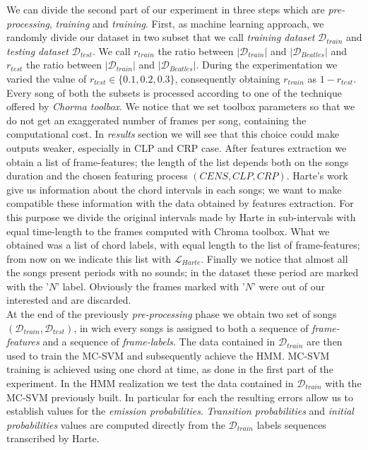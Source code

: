 We can divide the second part of our experiment in three steps which are \textit{pre-processing}, \textit{training} and \textit{training}. First, as machine learning approach, we randomly divide our dataset in two subset that we call \textit{training dataset} $\mathcal{D}_{train}$ and \textit{testing dataset}  $\mathcal{D}_{test}$. We call $r_{train}$ the ratio between $|\mathcal{D}_{train}|$ and $|\mathcal{D}_{Beatles}|$ and $r_{test}$ the ratio between $|\mathcal{D}_{train}|$ and $|\mathcal{D}_{Beatles}|$. During the experimentation we varied the value of $r_{test} \in \{0.1,0.2,0.3\}$, consequently obtaining $r_{train}$ as $1-r_{test}$. Every song of both the subsets is processed according to one of the technique offered by \textit{Chorma toolbox}. We notice that we set toolbox parameters so that we do not get an exaggerated number of frames per song, containing the computational cost. In \textit{results} section we will see that this choice could make outputs weaker, especially in CLP and CRP case. After features extraction we obtain a list of frame-features; the length of the list depends both on the songs duration and the chosen featuring process $(CENS,CLP,CRP)$. Harte's work give us information about the chord intervals in each songs; we want to make compatible these information with the data obtained by features extraction. For this purpose we divide the original intervals made by Harte in sub-intervals with equal time-length to the frames computed with Chroma toolbox. What we obtained was a list of chord labels, with equal length to the list of frame-features; from now on we indicate this list with $\mathcal{L}_{Harte}$. Finally we notice that almost all the songs present periods with no sounds; in the dataset these period are marked with the '$N$' label. Obviously the frames marked with '$N$' were out of our interested and are discarded. \\
%
At the end of the previously \textit{pre-processing} phase we obtain two set of songs $(\mathcal{D}_{train},\mathcal{D}_{test})$, in wich every songs is assigned to both a sequence of \textit{frame-features} and a sequence of \textit{frame-labels}. The data contained in $\mathcal{D}_{train}$ are then used to train the MC-SVM and subsequently achieve the HMM. MC-SVM training is achieved using one chord at time, as done in the first part of the experiment. In the HMM realization we test the data contained in $\mathcal{D}_{train}$ with the MC-SVM previously built. In particular for each  the resulting errors allow us to establish values for the \textit{emission probabilities}. \textit{Transition probabilities} and \textit{initial probabilities} values are computed directly from the $\mathcal{D}_{train}$ labels sequences transcribed by Harte. \\

